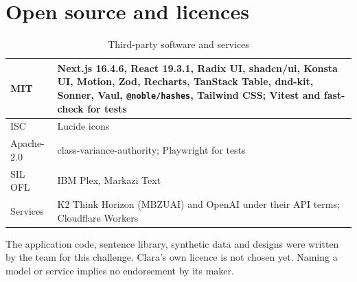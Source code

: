 \documentclass[10.5pt,a4paper]{article}
\newcommand{\chapterbreak}{}
\let\oldsection\section
\renewcommand{\section}{\chapterbreak\oldsection}
\newcommand{\toprl}{\arrayrulecolor{ink}\toprule\arrayrulecolor{rule}}
\newcommand{\code}[1]{\texttt{\small #1}}
\begin{document}
\section{Open source and licences}

{\small
\begin{xltabular}{\textwidth}{@{}P{2.6cm}L@{}}
\caption{Third-party software and services}\\
\toprl
MIT & Next.js 16.4.6, React 19.3.1, Radix UI, shadcn/ui, Konsta UI, Motion, Zod, Recharts, TanStack Table, dnd-kit, Sonner, Vaul, \code{@noble/hashes}, Tailwind CSS; Vitest and fast-check for tests\\
\midrule
ISC & Lucide icons\\
\midrule
Apache-2.0 & class-variance-authority; Playwright for tests\\
\midrule
SIL OFL & IBM Plex, Markazi Text\\
\midrule
Services & K2 Think Horizon (MBZUAI) and OpenAI under their API terms; Cloudflare Workers\\
\bottomrule
\end{xltabular}}

The application code, sentence library, synthetic data and designs were written by the team for this challenge.
Clara's own licence is not chosen yet. Naming a model or service implies no endorsement by its maker.
\end{document}
